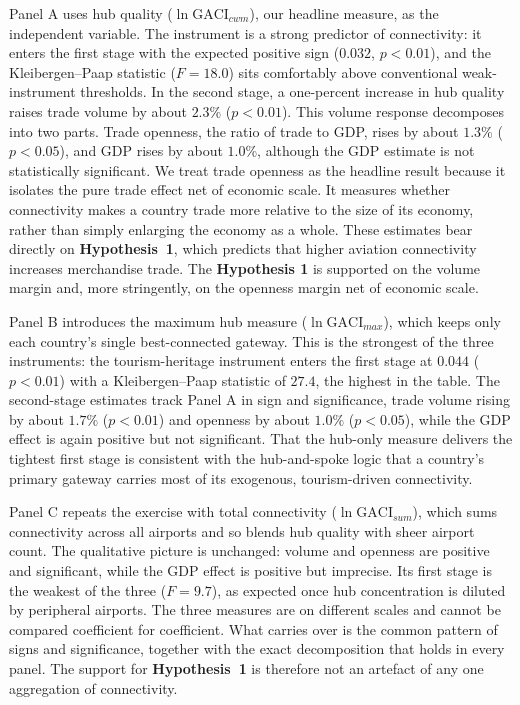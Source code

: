 Panel A uses hub quality ($\ln\mathrm{GACI}_{cwm}$), our headline measure, as the independent variable. The
instrument is a strong predictor of connectivity: it enters the first stage with
the expected positive sign ($0.032$, $p<0.01$), and the Kleibergen--Paap
statistic ($F=18.0$) sits comfortably above conventional weak-instrument
thresholds. In the second stage, a one-percent increase in hub quality raises
trade volume by about $2.3\%$ ($p<0.01$). This volume response decomposes into two
parts. Trade openness, the ratio of trade to GDP, rises by about $1.3\%$
($p<0.05$), and GDP rises by about $1.0\%$, although the GDP estimate is not
statistically significant. We treat trade openness as the headline result because
it isolates the pure trade effect net of economic scale. It measures whether
connectivity makes a country trade more relative to the size of its economy,
rather than simply enlarging the economy as a whole. These estimates bear
directly on \textbf{Hypothesis~1}, which predicts that higher aviation connectivity
increases merchandise trade. The \textbf{Hypothesis 1} is supported on the volume margin
and, more stringently, on the openness margin net of economic scale.

Panel B introduces the maximum hub measure ($\ln\mathrm{GACI}_{max}$), which keeps
only each country's single best-connected gateway. This is the strongest of the
three instruments: the tourism-heritage instrument enters the first stage at
$0.044$ ($p<0.01$) with a Kleibergen--Paap statistic of $27.4$, the highest in the
table. The second-stage estimates track Panel A in sign and significance, trade
volume rising by about $1.7\%$ ($p<0.01$) and openness by about $1.0\%$
($p<0.05$), while the GDP effect is again positive but not significant. That the
hub-only measure delivers the tightest first stage is consistent with the
hub-and-spoke logic that a country's primary gateway carries most of its
exogenous, tourism-driven connectivity.

Panel C repeats the exercise with total connectivity ($\ln\mathrm{GACI}_{sum}$),
which sums connectivity across all airports and so blends hub quality with sheer
airport count. The qualitative picture is unchanged: volume and openness are
positive and significant, while the GDP effect is positive but imprecise. Its
first stage is the weakest of the three ($F=9.7$), as expected once hub
concentration is diluted by peripheral airports. The three measures are on
different scales and cannot be compared coefficient for coefficient. What carries
over is the common pattern of signs and significance, together with the exact
decomposition that holds in every panel. The support for \textbf{Hypothesis~1} is
therefore not an artefact of any one aggregation of connectivity.

